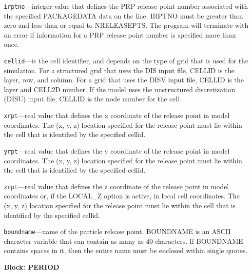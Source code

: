 \begin{description}
\item \texttt{irptno}---integer value that defines the PRP release point number associated with the specified PACKAGEDATA data on the line. IRPTNO must be greater than zero and less than or equal to NRELEASEPTS.  The program will terminate with an error if information for a PRP release point number is specified more than once.

\item \texttt{cellid}---is the cell identifier, and depends on the type of grid that is used for the simulation.  For a structured grid that uses the DIS input file, CELLID is the layer, row, and column.   For a grid that uses the DISV input file, CELLID is the layer and CELL2D number.  If the model uses the unstructured discretization (DISU) input file, CELLID is the node number for the cell.

\item \texttt{xrpt}---real value that defines the x coordinate of the release point in model coordinates.  The (x, y, z) location specified for the release point must lie within the cell that is identified by the specified cellid.

\item \texttt{yrpt}---real value that defines the y coordinate of the release point in model coordinates.  The (x, y, z) location specified for the release point must lie within the cell that is identified by the specified cellid.

\item \texttt{zrpt}---real value that defines the z coordinate of the release point in model coordinates or, if the LOCAL\_Z option is active, in local cell coordinates.  The (x, y, z) location specified for the release point must lie within the cell that is identified by the specified cellid.

\item \texttt{boundname}---name of the particle release point. BOUNDNAME is an ASCII character variable that can contain as many as 40 characters. If BOUNDNAME contains spaces in it, then the entire name must be enclosed within single quotes.

\end{description}
\item \textbf{Block: PERIOD}

